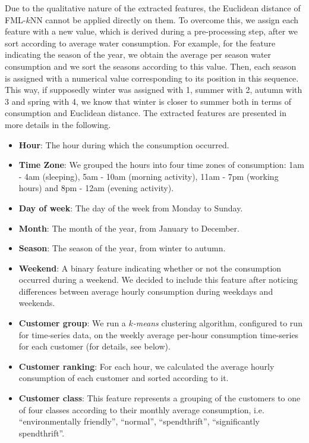 Due to the qualitative nature of the extracted features, the Euclidean distance of FML-$k$NN cannot be applied directly on them. To overcome this, we assign each feature with a new value, which is derived during a pre-processing step, after we sort according to average water consumption. For example, for the feature indicating the season of the year, we obtain the average per season water consumption and we sort the seasons according to this value. Then, each season is assigned with a numerical value corresponding to its position in this sequence. This way, if supposedly winter was assigned with 1, summer with 2, autumn with 3 and spring with 4, we know that winter is closer to summer both in terms of consumption and Euclidean distance. The extracted features are presented in more details in the following.

\begin{itemize}
\item \textbf{Hour}: The hour during which the consumption occurred.
\item \textbf{Time Zone}: We grouped the hours into four time zones of consumption: 1am - 4am (sleeping), 5am - 10am (morning activity), 11am - 7pm (working hours) and 8pm - 12am (evening activity).
\item \textbf{Day of week}: The day of the week from Monday to Sunday.
\item \textbf{Month}: The month of the year, from January to December.
\item \textbf{Season}: The season of the year, from winter to autumn.
\item \textbf{Weekend}: A binary feature indicating whether or not the consumption occurred during a weekend. We decided to include this feature after noticing differences between average hourly consumption during weekdays and weekends.
\item \textbf{Customer group}: We run a \textit{$k$-means} clustering algorithm, configured to run for time-series data, on the weekly average per-hour consumption time-series for each customer (for details, see below).
\item \textbf{Customer ranking}: For each hour, we calculated the average hourly consumption of each customer and sorted according to it.
\item \textbf{Customer class}: This feature represents a grouping of the customers to one of four classes according to their monthly average consumption, i.e. ``environmentally friendly'', ``normal'', ``spendthrift'', ``significantly spendthrift''.
\end{itemize}


